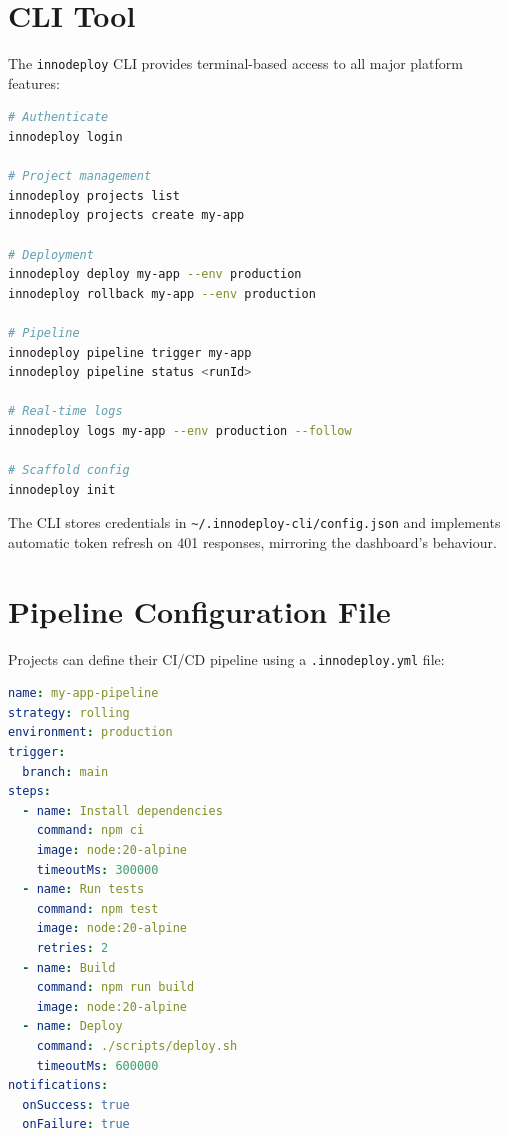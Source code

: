 \documentclass[12pt,a4paper,twoside]{report}
\begin{document}
\section{CLI Tool}

The \texttt{innodeploy} CLI provides terminal-based access to all major platform features:

\begin{lstlisting}[language=bash, caption={CLI Command Examples}]
# Authenticate
innodeploy login

# Project management
innodeploy projects list
innodeploy projects create my-app

# Deployment
innodeploy deploy my-app --env production
innodeploy rollback my-app --env production

# Pipeline
innodeploy pipeline trigger my-app
innodeploy pipeline status <runId>

# Real-time logs
innodeploy logs my-app --env production --follow

# Scaffold config
innodeploy init
\end{lstlisting}

The CLI stores credentials in \texttt{\textasciitilde/.innodeploy-cli/config.json} and implements automatic token refresh on 401 responses, mirroring the dashboard's behaviour.

\section{Pipeline Configuration File}

Projects can define their CI/CD pipeline using a \texttt{.innodeploy.yml} file:

\begin{lstlisting}[language=yaml, caption={.innodeploy.yml Configuration Example}]
name: my-app-pipeline
strategy: rolling
environment: production
trigger:
  branch: main
steps:
  - name: Install dependencies
    command: npm ci
    image: node:20-alpine
    timeoutMs: 300000
  - name: Run tests
    command: npm test
    image: node:20-alpine
    retries: 2
  - name: Build
    command: npm run build
    image: node:20-alpine
  - name: Deploy
    command: ./scripts/deploy.sh
    timeoutMs: 600000
notifications:
  onSuccess: true
  onFailure: true
\end{lstlisting}


\end{document}
